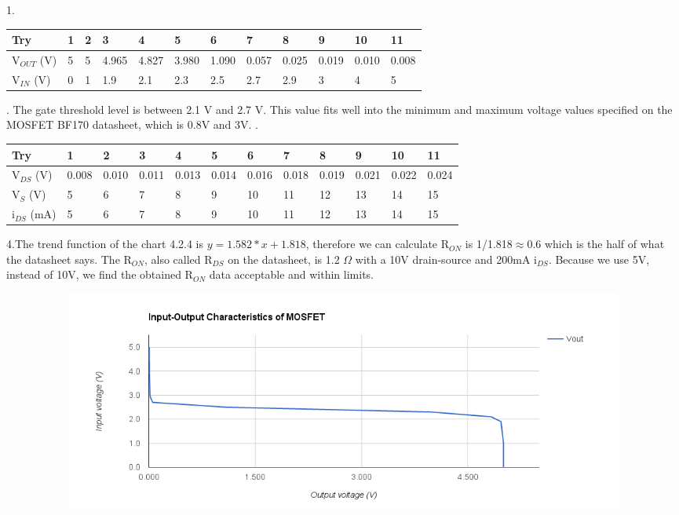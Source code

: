 {	\begin{solution}
		1. 		
		\begin{table}[h!]
			\begin{tabular}{| l | l | l | l | l | l | l | l | l | l | l | l |}
				\hline
				Try & 1 & 2 & 3 & 4 & 5 & 6 & 7 & 8 & 9 & 10 & 11 \\ \hline
				V$_{OUT}$ (V) & 5 & 5 & 4.965 & 4.827 & 3.980 & 1.090 & 0.057 & 0.025 & 0.019 & 0.010 & 0.008 \\ \hline
				V$_{IN}$ (V) & 0 & 1 & 1.9 & 2.1 & 2.3 & 2.5 & 2.7 & 2.9 & 3 & 4 & 5 \\ \hline
			\end{tabular}
		\end{table}
		.
		The gate threshold level is between 2.1 V and 2.7 V. This value fits well into the minimum and maximum voltage values specified on the MOSFET BF170 datasheet, which is 0.8V and 3V.
		.
		\begin{table}[h!]
			\begin{tabular}{| l | l | l | l | l | l | l | l | l | l | l | l |}
				\hline
				Try & 1 & 2 & 3 & 4 & 5 & 6 & 7 & 8 & 9 & 10 & 11 \\ \hline
				V$_{DS}$ (V) & 0.008 & 0.010 & 0.011 & 0.013 & 0.014 & 0.016 & 0.018 & 0.019 & 0.021 & 0.022 & 0.024 \\ \hline
				V$_{S}$ (V) & 5 & 6 & 7 & 8 & 9 & 10 & 11 & 12 & 13 & 14 & 15 \\ \hline
				i$_{DS}$ (mA) & 5 & 6 & 7 & 8 & 9 & 10 & 11 & 12 & 13 & 14 & 15 \\ \hline
			\end{tabular}
		\end{table}
		\newline
		4.The trend function of the chart 4.2.4 is $y = 1.582 * x + 1.818$, therefore we can calculate R$_{ON}$ is 1/1.818\(\approx\)0.6 which is the half of what the datasheet says. The R$_{ON}$, also called R$_{DS}$ on the datasheet, is 1.2 \(\Omega\) with a 10V drain-source and 200mA i$_{DS}$. Because we use 5V, instead of 10V, we find the obtained R$_{ON}$ data acceptable and within limits.
		\newline
		\begin{figure}[h!]
			\begin{subfigure}[H]{0.5\textwidth}
				\includegraphics[width=1\textwidth]{images/plot422.png}

\end{subfigure}
\end{figure}
\end{solution}}
